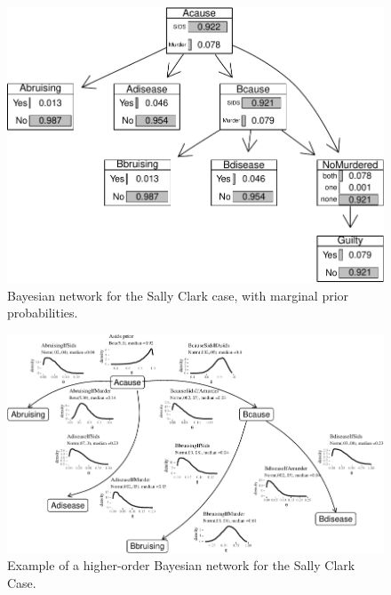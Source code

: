 \documentclass[
  10pt,
  dvipsnames,enabledeprecatedfontcommands]{scrartcl}
\begin{document}
\begin{figure}[H]

\begin{center}\includegraphics[width=0.5\linewidth]{paper-outline_files/figure-latex/scBNplot2-1} \end{center}
\caption{Bayesian network for the Sally Clark case, with marginal prior probabilities.}
\label{fig:scBNplot}
\end{figure}

\begin{figure}[H]

\begin{center}\includegraphics[width=1.1\linewidth,height=2\textheight,angle=90]{paper-outline_files/figure-latex/SCwithHOP-1} \end{center}

\caption{Example of a higher-order Bayesian network for the Sally Clark Case.}
\label{fig:SCwithHOP}
\end{figure}
\end{document}
